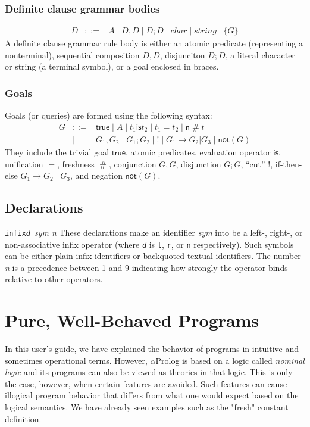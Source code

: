 \documentclass[draft,12pt]{report}
\newcommand{\aprolog}{$\alpha${Prolog}\xspace}
\newcommand{\fresh}{\mathrel\#}
\begin{document}
\subsubsection{Definite clause grammar bodies}

\begin{eqnarray*}
D &::=&  A \mid D , D \mid D ; D \mid char \mid string \mid \{G\}
\end{eqnarray*}
A definite clause grammar rule body is either an atomic predicate
(representing a nonterminal), sequential composition $D,D$,
disjunciton $D;D$, a literal character or string (a terminal symbol),
or a goal enclosed in braces.

\subsubsection{Goals}

Goals (or queries) are formed using the following syntax:
\begin{eqnarray*}
G &::=& \mathsf{true} \mid A \mid t_1 \mathrel{\mathsf{is}} t_2 \mid t_1 = t_2 \mid \mathsf{n} \fresh t \\
&\mid& G_1 , G_2 \mid G_1 ; G_2 \mid {!} \mid G_1 \to G_2|G_3 \mid \mathsf{not}(G)
\end{eqnarray*}
They include the trivial goal $\mathsf{true}$, atomic predicates,
evaluation operator $\mathsf{is}$, unification $=$, freshness
$\fresh$, conjunction $G,G$, disjunction $G;G$, ``cut'' $!$,
if-then-else $G_1 \to G_2 \mid G_3$, and negation $\mathsf{not}(G)$.

\subsection{Declarations}

{\tt infix{\em d}}\ {\it sym n} These declarations make an identifier
{\it sym} into be a left-, right-, or non-associative infix operator
(where {\tt \em d} is {\tt l}, {\tt r}, or {\tt n} respectively).
Such symbols can be either plain infix identifiers or backquoted
textual identifiers.  The number {\it n} is a precedence between 1 and
9 indicating how strongly the operator binds relative to other
operators.


\section{Pure, Well-Behaved Programs}

In this user's guide, we have explained the behavior of programs in 
intuitive and sometimes operational terms.  However, \aprolog is based
on a logic called \emph{nominal logic} and its programs can also be viewed
as theories in that logic.  This is only the case, however, when 
certain features are avoided.  Such features can cause illogical program behavior that  
differs from what one would expect based on the logical semantics.  We
have already seen examples such as the "fresh" constant definition.
\end{document}

